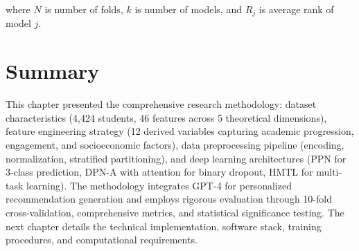 where $N$ is number of folds, $k$ is number of models, and $R_j$ is average rank of model $j$.

\section{Summary}

This chapter presented the comprehensive research methodology: dataset characteristics (4,424 students, 46 features across 5 theoretical dimensions), feature engineering strategy (12 derived variables capturing academic progression, engagement, and socioeconomic factors), data preprocessing pipeline (encoding, normalization, stratified partitioning), and deep learning architectures (PPN for 3-class prediction, DPN-A with attention for binary dropout, HMTL for multi-task learning). The methodology integrates GPT-4 for personalized recommendation generation and employs rigorous evaluation through 10-fold cross-validation, comprehensive metrics, and statistical significance testing. The next chapter details the technical implementation, software stack, training procedures, and computational requirements.

